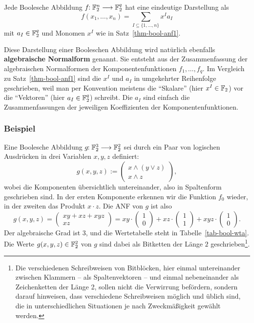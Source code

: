 \begin{refsegment}
\begin{satz}\label{thm-bool-anf3}
  Jede Boolesche Abbildung $f\!\!: \mathbb{F}_2^n \longrightarrow \mathbb{F}_2^q$ hat
  eine eindeutige Darstellung als
\[
  f(x_1,\ldots,x_n) = \sum_{I \subseteq \{1,\ldots,n\}} x^I a_I
\]
  mit $a_I \in \mathbb{F}_2^q$ und Monomen $x^I$ wie in Satz~\ref{thm-bool-anf1}.
\end{satz}
Diese Darstellung einer Booleschen
Abbildung wird natürlich ebenfalls
\textbf{algebraische Normalform}
genannt.
Sie entsteht aus der Zusammenfassung der algebraischen Normalformen
der Komponentenfunktionen $f_1, \ldots, f_q$.
Im Vergleich zu Satz~\ref{thm-bool-anf1} sind die $x^I$ und $a_I$
in umgekehrter Reihenfolge geschrieben,
weil man per Konvention meistens die "`Skalare"' (hier $x^I \in \mathbb{F}_2$)
vor die "`Vektoren"' (hier $a_I \in \mathbb{F}_2^q$) schreibt.
Die $a_I$ sind einfach die Zusammenfassungen der jeweiligen Koeffizienten
der Komponentenfunktionen.

\subsubsection*{Beispiel}

Eine Boolesche Abbildung $g\!\!: \mathbb{F}_2^3 \longrightarrow \mathbb{F}_2^2$ sei
durch ein Paar von logischen Ausdrücken in drei Variablen $x, y, z$
definiert:
\[
     g(x,y,z) := \begin{pmatrix}
                    x \wedge (y \vee z) \\
                    x \wedge z
                 \end{pmatrix},
\]
wobei die Komponenten übersichtlich untereinander, also in
Spaltenform geschrieben sind.
In der ersten Komponente erkennen wir die Funktion $f_0$ wieder,
in der zweiten das Produkt $x \cdot z$. Die ANF von $g$ ist also
\[
     g(x,y,z) = \begin{pmatrix} xy + xz + xyz \\ xz \end{pmatrix}
              = xy \cdot \begin{pmatrix} 1 \\ 0 \end{pmatrix}
              + xz \cdot \begin{pmatrix} 1 \\ 1 \end{pmatrix}
              + xyz \cdot \begin{pmatrix} 1 \\ 0 \end{pmatrix}.
\]
Der algebraische Grad ist $3$, und die Wertetabelle steht in
Tabelle~\ref{tab-bool-wta}. Die Werte $g(x,y,z) \in \mathbb{F}_2^2$
von $g$ sind dabei als Bitketten der Länge $2$ geschrieben\footnote{%
  Die verschiedenen Schreibweisen von Bitblöcken,
  hier einmal untereinander
  zwischen Klammern -- als Spaltenvektoren -- und einmal nebeneinander als
  Zeichenketten der Länge 2, sollen nicht die Verwirrung befördern,
  sondern darauf hinweisen, dass verschiedene Schreibweisen möglich
  und üblich sind, die in unterschiedlichen Situationen je nach
  Zweckmäßigkeit gewählt werden.
}.


\end{refsegment}
